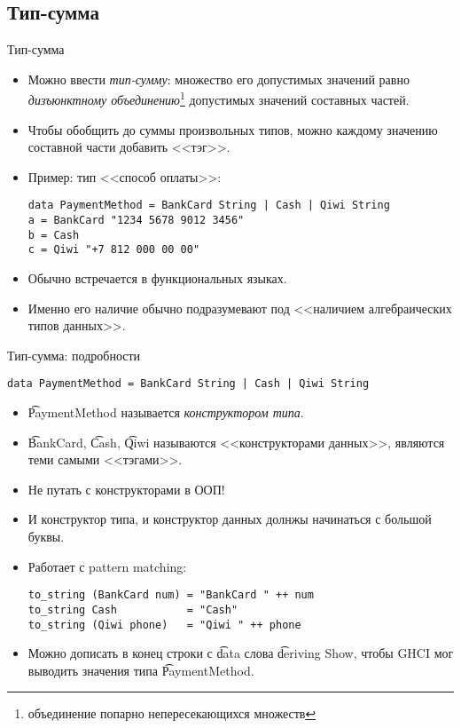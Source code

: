 \subsection{Тип-сумма}
\begin{frame}[fragile]{Тип-сумма}
	\begin{itemize}
		\item Можно ввести \textit{тип-сумму}: множество его допустимых значений равно \textit{дизъюнктному объединению}\footnote{объединение попарно непересекающихся множеств} допустимых значений составных частей.
		\item Чтобы обобщить до суммы произвольных типов, можно каждому значению составной части добавить <<тэг>>.
		\item Пример: тип <<способ оплаты>>:
\begin{verbatim}
data PaymentMethod = BankCard String | Cash | Qiwi String
a = BankCard "1234 5678 9012 3456"
b = Cash
c = Qiwi "+7 812 000 00 00"
\end{verbatim}
		\item Обычно встречается в функциональных языках.
		\item Именно его наличие обычно подразумевают под <<наличием алгебраических типов данных>>.
	\end{itemize}
\end{frame}

\begin{frame}[fragile]{Тип-сумма: подробности}
\begin{verbatim}
data PaymentMethod = BankCard String | Cash | Qiwi String
\end{verbatim}
	\begin{itemize}
		\item \t{PaymentMethod} называется \textit{конструктором типа}.
		\item \t{BankCard}, \t{Cash}, \t{Qiwi} называются <<конструкторами данных>>, являются теми самыми <<тэгами>>.
		\item Не путать с конструкторами в ООП!
		\item И конструктор типа, и конструктор данных долнжы начинаться с большой буквы.
		\item Работает с pattern matching:
\begin{verbatim}
to_string (BankCard num) = "BankCard " ++ num
to_string Cash           = "Cash"
to_string (Qiwi phone)   = "Qiwi " ++ phone
\end{verbatim}
		\item Можно дописать в конец строки с \t{data} слова \t{deriving Show}, чтобы GHCI мог выводить значения типа \t{PaymentMethod}.
	\end{itemize}
\end{frame}

